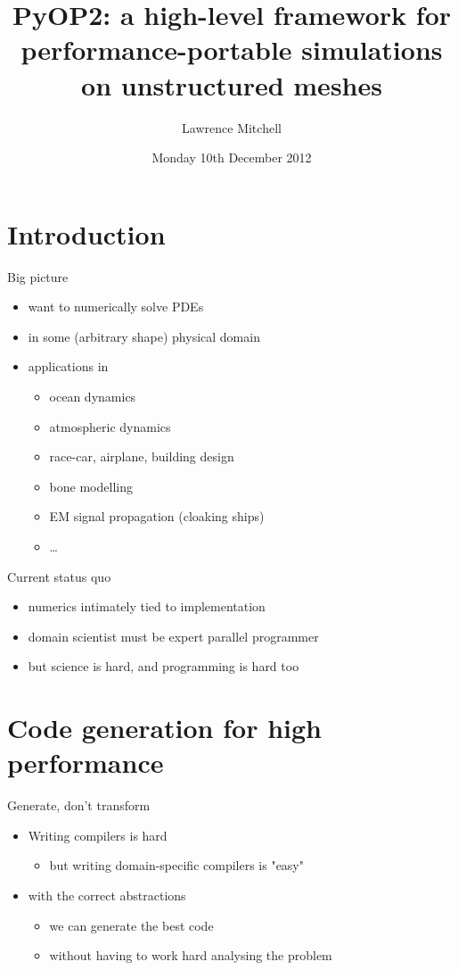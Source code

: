 \documentclass[bigger]{beamer}
\institute{EPCC, The University of Edinburgh}
\author{Lawrence Mitchell}
\date{Monday 10th December 2012}
\title{PyOP2: a high-level framework for performance-portable simulations on unstructured meshes}
\begin{document}
\maketitle


\section{Introduction}
\label{sec:orgheadline3}


\begin{frame}[label={sec:orgheadline1}]{Big picture}
\begin{itemize}
\item want to numerically solve PDEs
\item in some (arbitrary shape) physical domain
\item applications in
\begin{itemize}
\item ocean dynamics
\item atmospheric dynamics
\item race-car, airplane, building design
\item bone modelling
\item EM signal propagation (cloaking ships)
\item \ldots{}
\end{itemize}
\end{itemize}
\end{frame}

\begin{frame}[label={sec:orgheadline2}]{Current status quo}
\begin{itemize}
\item numerics intimately tied to implementation
\item domain scientist must be expert parallel programmer
\item but science is hard, and programming is hard too
\end{itemize}
\end{frame}

\section{Code generation for high performance}
\label{sec:orgheadline10}

\begin{frame}[label={sec:orgheadline4}]{Generate, don't transform}
\begin{itemize}
\item Writing compilers is hard
\begin{itemize}
\item but writing domain-specific compilers is "easy"
\end{itemize}
\item with the correct abstractions
\begin{itemize}
\item we can generate the best code
\item without having to work hard analysing the problem
\end{itemize}
\end{itemize}
\end{frame}
\end{document}
